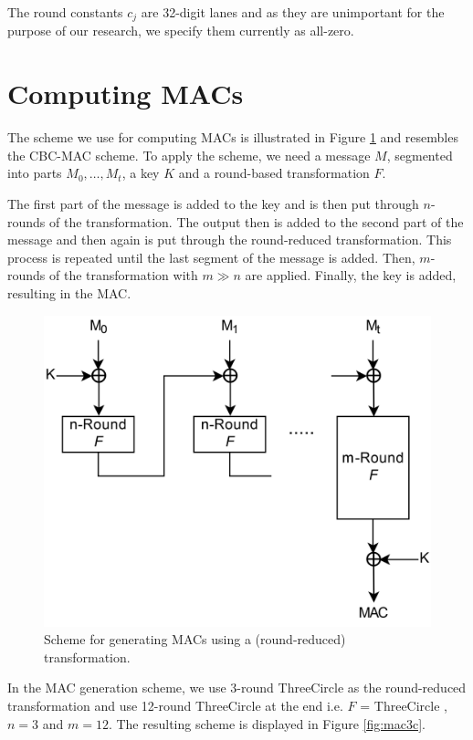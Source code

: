 \documentclass{report}
\newcommand{\ThreeCircle}{{\sc ThreeCircle} }
\begin{document}
The round constants $c_j$ are 32-digit lanes and as they are unimportant for the purpose of our research,
we specify them currently as all-zero.


\section{Computing MACs}
The scheme we use for computing MACs is illustrated in Figure \ref{fig:mac} and resembles the CBC-MAC scheme. To apply the scheme, we need a message $M$, segmented into parts $M_0, \dots, M_t$, a key $K$ and a round-based transformation $F$.

The first part of the message is added to the key and is then put through $n$-rounds of the transformation. The output then is added to the second part of the message and then again is put through the round-reduced transformation. This process is repeated until the last segment of the message is added. Then, $m$-rounds of the transformation with $m \gg n$ are applied. Finally, the key is added, resulting in the MAC.

\begin{figure}[!ht]
\centering
\includegraphics[scale=0.125]{imgs/HMAC_HighResV2.png}
\caption{Scheme for generating MACs using a (round-reduced) transformation.}
\label{fig:mac}
\end{figure}

In the MAC generation scheme, we use 3-round \ThreeCircle as the round-reduced transformation and use 12-round \ThreeCircle at the end i.e. $F$ = \ThreeCircle, $n=3$ and $m=12$. The resulting scheme is displayed in Figure \ref{fig:mac3c}.
\end{document}
